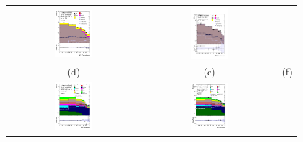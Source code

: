 \begin{figure}[H]
\begin{tabular}{@{}ccc@{}}
\includegraphics[width=0.29\textwidth]{figures/tuH_reg1l1tau1b3j_os.pdf}&
\includegraphics[width=0.29\textwidth]{figures/tuH_reg1l2tau1bnj_ss.pdf}\\
(d) & (e)  & (f) \\
\includegraphics[width=0.29\textwidth]{figures/tuH_reg2mtau1b2jos.pdf}&
\includegraphics[width=0.29\textwidth]{figures/tuH_reg2mtau1b3jos.pdf}&

\end{tabular}
\end{figure}
